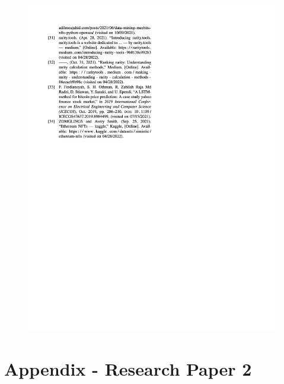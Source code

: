 \begin{figure}[h!]
\centering
\includegraphics[width=\textwidth]{images/appendix/papers/analysis/An Analysis of the Features Considerable for NFT Recommendations 7.jpeg}
\end{figure}


\newpage
\chapter{Appendix - Research Paper 2}

